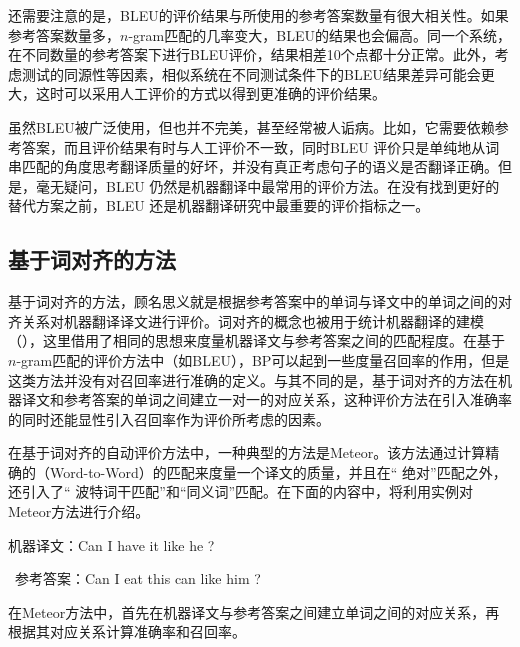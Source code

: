 \parinterval 还需要注意的是，BLEU的评价结果与所使用的参考答案数量有很大相关性。如果参考答案数量多，$n$-gram匹配的几率变大，BLEU的结果也会偏高。同一个系统，在不同数量的参考答案下进行BLEU评价，结果相差10个点都十分正常。此外，考虑测试的同源性等因素，相似系统在不同测试条件下的BLEU结果差异可能会更大，这时可以采用人工评价的方式以得到更准确的评价结果。

\parinterval 虽然BLEU被广泛使用，但也并不完美，甚至经常被人诟病。比如，它需要依赖参考答案，而且评价结果有时与人工评价不一致，同时BLEU 评价只是单纯地从词串匹配的角度思考翻译质量的好坏，并没有真正考虑句子的语义是否翻译正确。但是，毫无疑问，BLEU 仍然是机器翻译中最常用的评价方法。在没有找到更好的替代方案之前，BLEU 还是机器翻译研究中最重要的评价指标之一。


\subsection{基于词对齐的方法}

\parinterval 基于词对齐的方法，顾名思义就是根据参考答案中的单词与译文中的单词之间的对齐关系对机器翻译译文进行评价。词对齐的概念也被用于统计机器翻译的建模（\chapterfive），这里借用了相同的思想来度量机器译文与参考答案之间的匹配程度。在基于$n$-gram匹配的评价方法中（如BLEU），BP可以起到一些度量召回率的作用，但是这类方法并没有对召回率进行准确的定义。与其不同的是，基于词对齐的方法在机器译文和参考答案的单词之间建立一对一的对应关系，这种评价方法在引入准确率的同时还能显性引入召回率作为评价所考虑的因素。

\parinterval 在基于词对齐的自动评价方法中，一种典型的方法是Meteor。该方法通过计算精确的{\small{}}（Word-to-Word）的匹配来度量一个译文的质量，并且在“ 绝对”匹配之外，还引入了“ 波特词干匹配”和“同义词”匹配。在下面的内容中，将利用实例对Meteor方法进行介绍。

\begin{example}
机器译文：Can I have it like he ?

\qquad\  参考答案：Can I eat this can like him ?
\label{eg:4-2}
\end{example}

\parinterval 在Meteor方法中，首先在机器译文与参考答案之间建立单词之间的对应关系，再根据其对应关系计算准确率和召回率。

